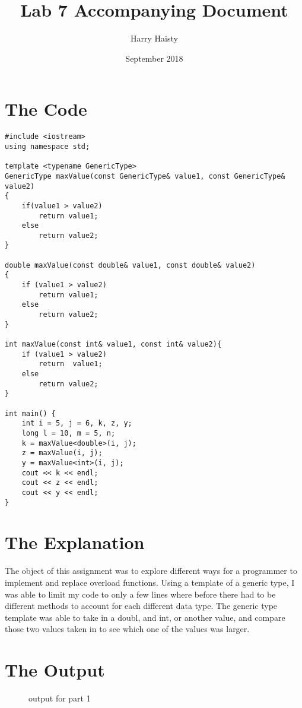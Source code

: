 \documentclass[11pt]{article}
\title{Lab 7  Accompanying Document}
\author{Harry Haisty}
\date{September 2018}
\begin{document}
\maketitle

\section*{The Code}
\begin{lstlisting}
#include <iostream>
using namespace std;

template <typename GenericType>
GenericType maxValue(const GenericType& value1, const GenericType& value2)
{
    if(value1 > value2)
        return value1;
    else
        return value2;
}

double maxValue(const double& value1, const double& value2)
{
    if (value1 > value2)
        return value1;
    else
        return value2;
}

int maxValue(const int& value1, const int& value2){
    if (value1 > value2)
        return  value1;
    else
        return value2;
}

int main() {
    int i = 5, j = 6, k, z, y;
    long l = 10, m = 5, n;
    k = maxValue<double>(i, j);
    z = maxValue(i, j);
    y = maxValue<int>(i, j);
    cout << k << endl;
    cout << z << endl;
    cout << y << endl;
}
\end{lstlisting}

\section*{The Explanation}
The object of this assignment was to explore different ways for a programmer to implement and replace overload functions. Using a template of a generic type, I was able to limit my code to only a few lines where before there had to be different methods to account for each different data type. 
The generic type template was able to take in a doubl, and int, or another value, and compare those two values taken in to see which one of the values was larger. 

\section*{The Output}
\begin{figure}[h]
\centering
{}
\caption {output for part 1}
\end{figure}
\end{document}

